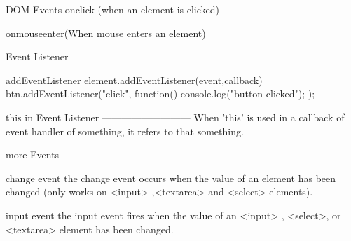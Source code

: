 DOM Events
onclick (when an element is clicked)

onmouseenter(When mouse enters an element)



Event Listener

addEventListener
element.addEventListener(event,callback)
btn.addEventListener("click", function(){
    console.log("button clicked");
});



this in Event Listener
---------------------------
When 'this' is used in a callback of event handler of something,
it refers to that something.


more Events
--------------

change event
the change event occurs when the value of an element has been changed
(only works on <input> ,<textarea> and <select> elements).


input event
the input event fires when the value of an <input> , <select>, or <textarea>
element has been changed.